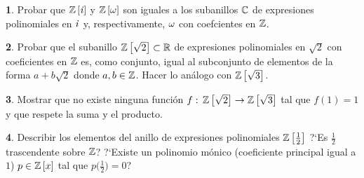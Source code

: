 \theoremstyle{definition}
\newtheorem{ejerPolinomios}{\ejername}[section]


\begin{ejerPolinomios}
	Probar que ${\mathbb{Z}}\left[\mathit i\right]$ y ${\mathbb{Z}}\left[\omega\right]$ son iguales a los
	subanillos $\mathbb{C}$ de expresiones polinomiales en $\mathit i$
	y, respectivamente, $\omega$ con coefcientes en $\mathbb{Z}$.
\end{ejerPolinomios}

\begin{ejerPolinomios}
	Probar que el subanillo ${\mathbb{Z}}\left[\sqrt 2\right]\subset\mathbb{R}$
	de expresiones polinomiales en $\sqrt 2$ con coeficientes en
	$\mathbb{Z}$ es, como conjunto, igual al subconjunto de elementos
	de la forma $a+b\sqrt 2$ donde $a,b\in\mathbb{Z}$.
	Hacer lo an\'alogo con ${\mathbb{Z}}\left[\sqrt 3\right]$.
\end{ejerPolinomios}

\begin{ejerPolinomios}
	Mostrar que no existe ninguna funci\'on
	\begin{math}
		f:\,{\mathbb{Z}}\left[\sqrt 2\right]\rightarrow
			{\ensuremath{\mathbb{Z}}}\left[\sqrt 3\right]
	\end{math}
	tal que $f(1)=1$ y que respete la suma y el producto.
\end{ejerPolinomios}

\begin{ejerPolinomios}
	Describir los elementos del anillo de expresiones polinomiales
	${\mathbb{Z}}\left[\frac 1{2}\right]$ ?`Es $\frac 1{2}$ trascendente
	sobre $\mathbb{Z}$? ?`Existe un polinomio m\'onico (coeficiente
	principal igual a $1$) $p\in{\ensuremath{\mathbb{Z}}}\left[x\right]$ tal que
	$p\big(\frac 1{2}\big)=0$?
\end{ejerPolinomios}

